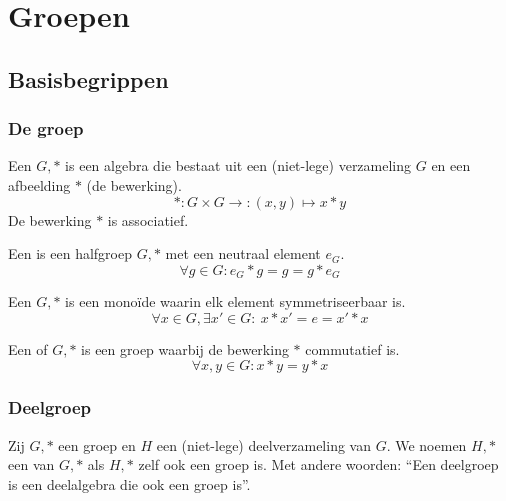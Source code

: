 \documentclass[main.tex]{subfiles}
\begin{document}
\chapter{Groepen}
\label{cha:groepen}

\section{Basisbegrippen}
\label{sec:basisbegrippen}

\subsection{De groep}
\label{sec:de-groep}

\begin{de}
  Een  $G,*$ is een algebra die bestaat uit een (niet-lege) verzameling $G$ en een afbeelding $*$ (de bewerking).
  \[ *: G \times G \rightarrow: (x,y) \mapsto x * y \]
  De bewerking $*$ is associatief.
\end{de}

\begin{de}
  Een  is een halfgroep $G,*$ met een neutraal element $e_{G}$.
  \[ \forall g \in G: e_{G} * g = g = g * e_{G} \]
\end{de}

\begin{de}
  \label{de:groep}
  Een  $G,*$ is een mono\"ide waarin elk element symmetriseerbaar is.
  \[ \forall x \in G, \exists x' \in G:\ x * x' = e = x' * x \]
\end{de}

\begin{de}
  Een  of  $G,*$ is een groep waarbij de bewerking $*$ commutatief is.
  \[ \forall x,y \in G: x * y = y * x\]
\end{de}

\subsection{Deelgroep}
\label{sec:deelgroep}

\begin{de}
  Zij $G,*$ een groep en $H$ een (niet-lege) deelverzameling van $G$. We noemen $H,*$ een  van $G,*$ als $H,*$ zelf ook een groep is.
  Met andere woorden: ``Een deelgroep is een deelalgebra die ook een groep is''.
\end{de}
\end{document}
